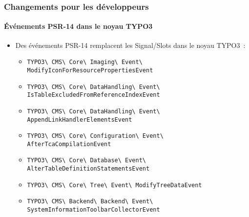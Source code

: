 \begin{frame}[fragile]
	\frametitle{Changements pour les développeurs}
	\framesubtitle{Événements PSR-14 dans le noyau TYPO3}

	\begin{itemize}
		\item Des événements PSR-14 remplacent les Signal/Slots dans le noyau TYPO3~:
			\newline

			\begin{itemize}\tiny
				\item \texttt{TYPO3\textbackslash
					CMS\textbackslash
					Core\textbackslash
					Imaging\textbackslash
					Event\textbackslash
					ModifyIconForResourcePropertiesEvent}
					\newline
				\item \texttt{TYPO3\textbackslash
					CMS\textbackslash
					Core\textbackslash
					DataHandling\textbackslash
					Event\textbackslash
					IsTableExcludedFromReferenceIndexEvent}
					\newline
				\item \texttt{TYPO3\textbackslash
					CMS\textbackslash
					Core\textbackslash
					DataHandling\textbackslash
					Event\textbackslash
					AppendLinkHandlerElementsEvent}
					\newline
				\item \texttt{TYPO3\textbackslash
					CMS\textbackslash
					Core\textbackslash
					Configuration\textbackslash
					Event\textbackslash
					AfterTcaCompilationEvent}
					\newline
				\item \texttt{TYPO3\textbackslash
					CMS\textbackslash
					Core\textbackslash
					Database\textbackslash
					Event\textbackslash
					AlterTableDefinitionStatementsEvent}
					\newline
				\item \texttt{TYPO3\textbackslash
					CMS\textbackslash
					Core\textbackslash
					Tree\textbackslash
					Event\textbackslash
					ModifyTreeDataEvent}
					\newline
				\item \texttt{TYPO3\textbackslash
					CMS\textbackslash
					Backend\textbackslash
					Backend\textbackslash
					Event\textbackslash
					SystemInformationToolbarCollectorEvent}
					\newline
			\end{itemize}

	\end{itemize}

\end{frame}

